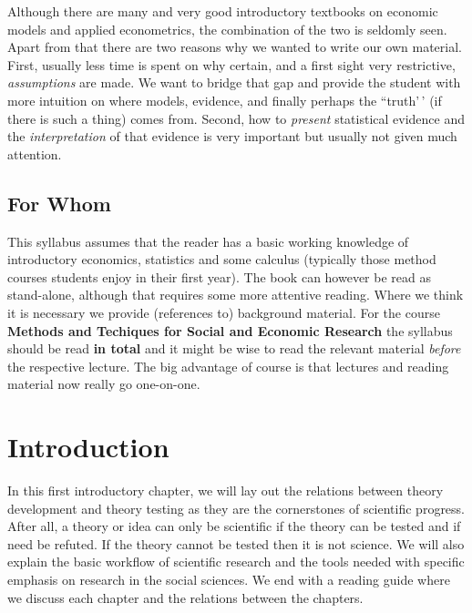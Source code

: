 \documentclass[
]{book}
\begin{document}
Although there are many and very good introductory textbooks on economic models and applied econometrics, the combination of the two is seldomly seen. Apart from that there are two reasons why we wanted to write our own material. First, usually less time is spent on why certain, and a first sight very restrictive, \emph{assumptions} are made. We want to bridge that gap and provide the student with more intuition on where models, evidence, and finally perhaps the ``truth'\,' (if there is such a thing) comes from. Second, how to \emph{present} statistical evidence and the \emph{interpretation} of that evidence is very important but usually not given much attention.

\hypertarget{for-whom}{%
\section*{For Whom}\label{for-whom}}

This syllabus assumes that the reader has a basic working knowledge of introductory economics, statistics and some calculus (typically those method courses students enjoy in their first year). The book can however be read as stand-alone, although that requires some more attentive reading. Where we think it is necessary we provide (references to) background material. For the course \textbf{Methods and Techiques for Social and Economic Research} the syllabus should be read \textbf{in total} and it might be wise to read the relevant material \emph{before} the respective lecture. The big advantage of course is that lectures and reading material now really go one-on-one.

\hypertarget{introduction}{%
\chapter{Introduction}\label{introduction}}

In this first introductory chapter, we will lay out the relations between theory development and theory testing as they are the cornerstones of scientific progress. After all, a theory or idea can only be scientific if the theory can be tested and if need be refuted. If the theory cannot be tested then it is not science. We will also explain the basic workflow of scientific research and the tools needed with specific emphasis on research in the social sciences. We end with a reading guide where we discuss each chapter and the relations between the chapters.
\end{document}
